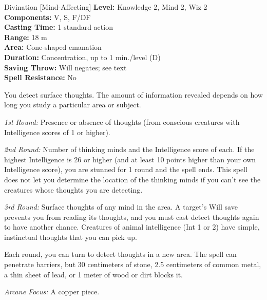 {Divination [Mind-Affecting]}
{
	\textbf{Level:}
	Knowledge 2, Mind 2, Wiz 2\\
	\textbf{Components:}
	V, S, F/DF\\
	\textbf{Casting Time:}
	1 standard action\\
	\textbf{Range:}
	18 m\\
	\textbf{Area:}
	Cone-shaped emanation\\
	\textbf{Duration:}
	Concentration, up to 1 min./level (D)\\
	\textbf{Saving Throw:}
	Will negates; see text\\
	\textbf{Spell Resistance:}
	No\\
}
{
	You detect surface thoughts. The amount of information revealed depends on how long you study a particular area or subject.

	\textit{1st Round:}
	Presence or absence of thoughts (from conscious creatures with Intelligence scores of 1 or higher).

	\textit{2nd Round:}
	Number of thinking minds and the Intelligence score of each. If the highest Intelligence is 26 or higher (and at least 10 points higher than your own Intelligence score), you are stunned for 1 round and the spell ends. This spell does not let you determine the location of the thinking minds if you can't see the creatures whose thoughts you are detecting.

	\textit{3rd Round:}
	Surface thoughts of any mind in the area. A target's Will save prevents you from reading its thoughts, and you must cast detect thoughts again to have another chance. Creatures of animal intelligence (Int 1 or 2) have simple, instinctual thoughts that you can pick up.

	Each round, you can turn to detect thoughts in a new area. The spell can penetrate barriers, but 30 centimeters of stone, 2.5 centimeters of common metal, a thin sheet of lead, or 1 meter of wood or dirt blocks it.

	\textit{Arcane Focus:}
	A copper piece.

}
